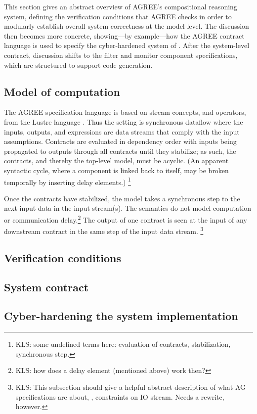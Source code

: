 This section gives an abstract overview of AGREE's compositional
reasoning system, defining the verification conditions that AGREE
checks in order to modularly establish overall system correctness at
the model level.  The discussion then becomes more concrete,
showing---by example---how the AGREE contract language is used to
specify the cyber-hardened system of .  After the
system-level contract, discussion shifts to the filter and monitor
component specifications, which are structured to support code
generation.


\subsection{Model of computation}

The AGREE specification language is based on stream concepts, and
operators, from the Lustre language \cite{10.1145/41625.41641}.  Thus
the setting is synchronous dataflow where the inputs, outputs, and
expressions are data streams that comply with the input assumptions.
Contracts are evaluated in dependency order with inputs being
propagated to outputs through all contracts until they stabilize; as
such, the contracts, and thereby the top-level model, must be
acyclic. (An apparent syntactic cycle, where a component is linked
back to itself, may be broken temporally by inserting delay
elements.) \footnote{KLS: some undefined terms here: evaluation of
contracts, stabilization, synchronous step.}


Once the contracts have stabilized, the model takes a synchronous step
to the next input data in the input stream(s).  The semantics do not
model computation or communication delay.\footnote{KLS: how does a
delay element (mentioned above) work then?}  The output of one
contract is seen at the input of any downstream contract in the same
step of the input data stream.
\footnote{KLS: This subsection should give a helpful abstract description of what AG specifications are about, \ie, constraints on IO stream. Needs a rewrite, however.}


\subsection{Verification conditions}


\subsection{System contract}


\subsection{Cyber-hardening the system implementation}

